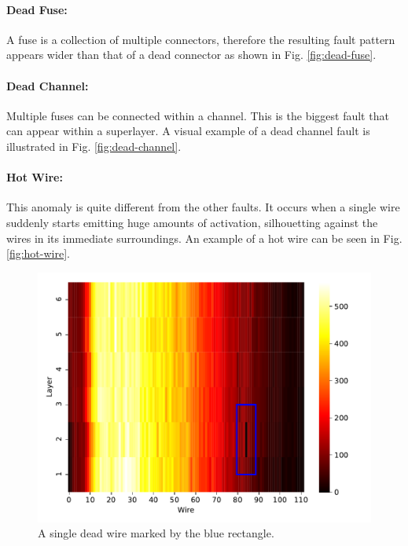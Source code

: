 \paragraph{Dead Fuse:}
A fuse is a collection of multiple
connectors, therefore the resulting fault pattern appears wider
than that of a dead connector as shown in
Fig. \ref{fig:dead-fuse}.

\paragraph{Dead Channel:}
Multiple fuses can be connected within
a channel. This is the biggest fault that can appear within a
superlayer. A visual example of a dead channel fault is illustrated in
Fig. \ref{fig:dead-channel}.

\paragraph{Hot Wire:}
This anomaly is quite different from the other faults. It occurs when
a single wire suddenly starts emitting huge amounts of activation,
silhouetting against the wires in its immediate surroundings. An
example of a hot wire can be seen in Fig. \ref{fig:hot-wire}.

\begin{figure}[h]
  \centering
  \includegraphics[width=\textwidth]{../figures/dead_wire}
  \caption{A single dead wire marked by the blue rectangle.}
  \label{fig:dead-wire}
\end{figure}

